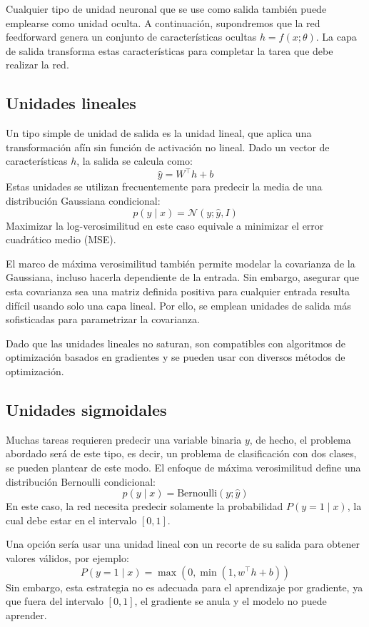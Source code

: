 Cualquier tipo de unidad neuronal que se use como salida también puede emplearse como unidad oculta. A continuación, supondremos que la red feedforward genera un conjunto de características ocultas $h = f(x; \theta)$. La capa de salida transforma estas características para completar la tarea que debe realizar la red.

\subsection{Unidades lineales}

Un tipo simple de unidad de salida es la unidad lineal, que aplica una transformación afín sin función de activación no lineal. Dado un vector de características $h$, la salida se calcula como:
\[
\hat{y} = W^\top h + b
\]
Estas unidades se utilizan frecuentemente para predecir la media de una distribución Gaussiana condicional:
\[
p(y \mid x) = \mathcal{N}(y; \hat{y}, I)
\]
Maximizar la log-verosimilitud en este caso equivale a minimizar el error cuadrático medio (MSE).

El marco de máxima verosimilitud también permite modelar la covarianza de la Gaussiana, incluso hacerla dependiente de la entrada. Sin embargo, asegurar que esta covarianza sea una matriz definida positiva para cualquier entrada resulta difícil usando solo una capa lineal. Por ello, se emplean unidades de salida más sofisticadas para parametrizar la covarianza.

Dado que las unidades lineales no saturan, son compatibles con algoritmos de optimización basados en gradientes y se pueden usar con diversos métodos de optimización.

\subsection{Unidades sigmoidales}

Muchas tareas requieren predecir una variable binaria $y$, de hecho, el problema abordado será de este tipo, es decir, un problema de clasificación con dos clases, se pueden plantear de este modo. El enfoque de máxima verosimilitud define una distribución Bernoulli condicional:
\[
p(y \mid x) = \text{Bernoulli}(y; \hat{y})
\]
En este caso, la red necesita predecir solamente la probabilidad $P(y = 1 \mid x)$, la cual debe estar en el intervalo $[0, 1]$.

Una opción sería usar una unidad lineal con un recorte de su salida para obtener valores válidos, por ejemplo:
\[
P(y = 1 \mid x) = \max\left(0, \min\left(1, w^\top h + b\right)\right)
\]
Sin embargo, esta estrategia no es adecuada para el aprendizaje por gradiente, ya que fuera del intervalo $[0, 1]$, el gradiente se anula y el modelo no puede aprender.

